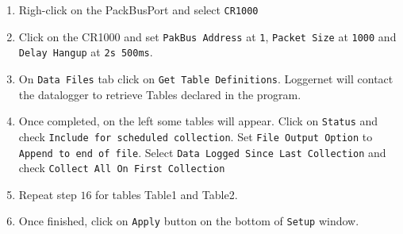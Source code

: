 \begin{enumerate}
	\item Righ-click on the PackBusPort and select {\tt CR1000}
	\item Click on the CR1000 and set {\tt PakBus Address} at {\tt 1}, {\tt Packet Size} at {\tt 1000} and {\tt Delay Hangup} at {\tt 2s 500ms}.
	\item On {\tt Data Files} tab click on {\tt Get Table Definitions}. Loggernet will contact the datalogger to retrieve Tables declared in the program.
	\item Once completed, on the left some tables will appear. Click on {\tt Status} and check {\tt Include for scheduled collection}. Set {\tt File Output Option} to {\tt Append to end of file}. Select {\tt Data Logged Since Last Collection} and check {\tt Collect All On First Collection}
	\item Repeat step $16$ for tables Table1 and Table2.
	\item Once finished, click on {\tt Apply} button on the bottom of {\tt Setup} window.
\end{enumerate}